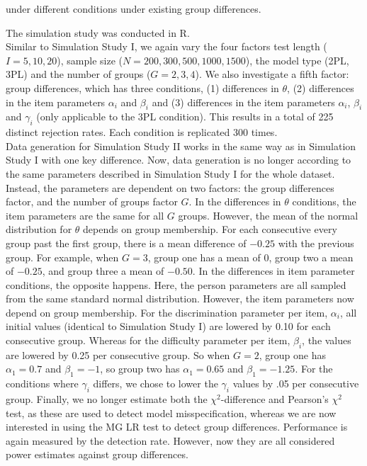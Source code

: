 \documentclass[Royal,sageapa,times,doublespace]{sagej}
\begin{document}
under different conditions under existing group differences. %

The simulation study was conducted in R. \\
\indent Similar to Simulation Study I, we again vary the four factors test length ($I = 5, 10, 20$), sample size ($N = 200, 300, 500, 1000, 1500$), the model type (2PL, 3PL) and the number of groups ($G = 2, 3, 4$). We also investigate a fifth factor: group differences, which has three conditions, (1) differences in $\theta$, (2) differences in the item parameters $\alpha_i$ and $\beta_i$ and (3) differences in the item parameters $\alpha_i$, $\beta_i$ and $\gamma_i$ (only applicable to the 3PL condition). This results in a total of 225 distinct rejection rates. Each condition is replicated 300 times. \\
\indent Data generation for Simulation Study II works in the same way as in Simulation Study I with one key difference. Now, data generation is no longer according to the same parameters described in Simulation Study I for the whole dataset. Instead, the parameters are dependent on two factors: the group differences factor, and the number of groups factor $G$. In the differences in $\theta$ conditions, the item parameters are the same for all $G$ groups. However, the mean of the normal distribution for $\theta$ depends on group membership. For each consecutive every group past the first group, there is a mean difference of $-0.25$ with the previous group. For example, when $G = 3$, group one has a mean of 0, group two a mean of $-0.25$, and group three a mean of $-0.50$. In the differences in item parameter conditions, the opposite happens. Here, the person parameters are all sampled from the same standard normal distribution. However, the item parameters now depend on group membership. For the discrimination parameter per item, $\alpha_i$, all initial values (identical to Simulation Study I) are lowered by 0.10 for each consecutive group. Whereas for the difficulty parameter per item, $\beta_i$, the values are lowered by 0.25 per consecutive group. So when $G = 2$, group one has $\alpha_1 = 0.7$ and $\beta_1 = -1$, so group two has $\alpha_1 = 0.65$ and $\beta_1 = -1.25$. For the conditions where $\gamma_i$ differs, we chose to lower the $\gamma_i$ values by .05 per consecutive group. Finally, we no longer estimate both the $\chi^2$-difference and Pearson's $\chi^2$ test, as these are used to detect model misspecification, whereas we are now interested in using the MG LR test to detect group differences. Performance is again measured by the detection rate. However, now they are all considered power estimates against group differences.
\end{document}
